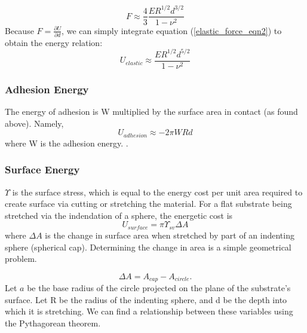 \begin{equation}
F \approx \frac{4}{3}\frac{ER^{1/2}d^{3/2}}{1-\nu^2}
\label{elastic_force_eqn2}
\end{equation}
Because $F = \frac{\partial U}{\partial d}$, we can simply integrate equation (\ref{elastic_force_eqn2}) to obtain the energy relation:
\begin{equation}
\label{elastic_energy}
U_{elastic} \approx  \frac{ER^{1/2}d^{5/2}}{1-\nu^2}
\end{equation}


\subsubsection{Adhesion Energy}
The energy of adhesion is W multiplied by the surface area in contact (as found above). Namely,
\begin{equation}
\label{W_energy}
U_{adhesion} \approx -2\pi W R d 
\end{equation}
where W is the adhesion energy. . 

\subsubsection{Surface Energy}
$\Upsilon$ is the surface stress, which is equal to the energy cost per unit area required to create surface via cutting or stretching the material. For a flat substrate being stretched via the indendation of a sphere, the energetic cost is
\begin{equation}
\label{generic_surface_energy}
U_{surface} = \pi \Upsilon_{sv}\Delta A
\end{equation}
where $\Delta A$ is the change in surface area when stretched by part of an indenting sphere (spherical cap). Determining the change in area is a simple geometrical problem.

\begin{equation}
\Delta A = A_{cap} - A_{circle}. 
\end{equation}
Let $ a $ be the base radius of the circle projected on the plane of the substrate's surface. Let R be the radius of the indenting sphere, and d be the depth into which it is stretching. We can find a relationship between these variables using the Pythagorean theorem.

